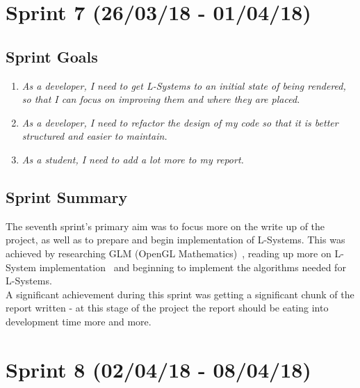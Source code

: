 \documentclass[a4paper,10pt]{report}
\begin{document}
\section{Sprint 7 (26/03/18 -  01/04/18)}

\subsection{Sprint Goals}

\begin{enumerate}

\item \textit{As a developer, I need to get L-Systems to an initial state of being rendered, so that I can focus on improving them and where they are placed.}

\item \textit{As a developer, I need to refactor the design of my code so that it is better structured and easier to maintain.}

\item \textit{As a student, I need to add a lot more to my report. }
\end{enumerate}

\subsection{Sprint Summary}

The seventh sprint's primary aim was to focus more on the write up of the project, as well as to prepare and begin implementation of L-Systems. This was achieved by researching GLM (OpenGL Mathematics)~\cite{creation2016opengl}, reading up more on L-System implementation~\cite{prusinkiewicz2012algorithmic} and beginning to implement the algorithms needed for L-Systems.\\

A significant achievement during this sprint was getting a significant chunk of the report written - at this stage of the project the report should be eating into development time more and more.


\section{Sprint 8 (02/04/18 -  08/04/18)}
\end{document}
